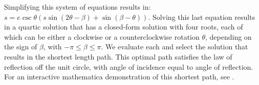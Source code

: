  Simplifying this system of equations results in: $s=e \csc \theta (s \sin(2 \theta-\beta)+\sin(\beta-\theta))$. Solving this last equation results in a quartic solution that has a closed-form solution with four roots, each of which can be either a clockwise or a counterclockwise rotation $\theta$, depending on the sign of $\beta$, with $-\pi\leq\beta\leq\pi$. We evaluate each and select the solution that results in the shortest length path. This optimal path satisfies the law of reflection off the unit circle, with angle of incidence equal to angle of reflection. For an interactive mathematica demonstration of this shortest path, see \cite{shortestPathMathematica}.
 
  
 